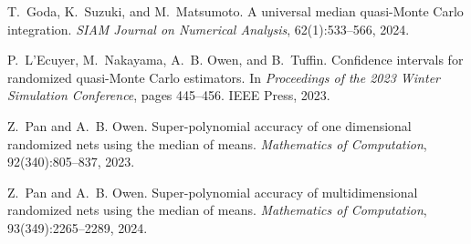 \begin{talk}
{\item
T.~Goda, K.~Suzuki, and M.~Matsumoto.
A universal median quasi-{Monte Carlo} integration.
{\em {SIAM} Journal on Numerical Analysis}, 62(1):533--566, 2024.

\item
P.~L'Ecuyer, M.~Nakayama, A.~B. Owen, and B.~Tuffin.
Confidence intervals for randomized quasi-{Monte Carlo} estimators.
In {\em Proceedings of the 2023 Winter Simulation Conference}, pages
  445--456. IEEE Press, 2023.

\item
Z.~Pan and A.~B. Owen.
Super-polynomial accuracy of one dimensional randomized nets using
  the median of means.
{\em Mathematics of Computation}, 92(340):805--837, 2023.

\item
Z.~Pan and A.~B. Owen.
Super-polynomial accuracy of multidimensional randomized nets using
  the median of means.
{\em Mathematics of Computation}, 93(349):2265--2289, 2024.

}
\end{talk}

